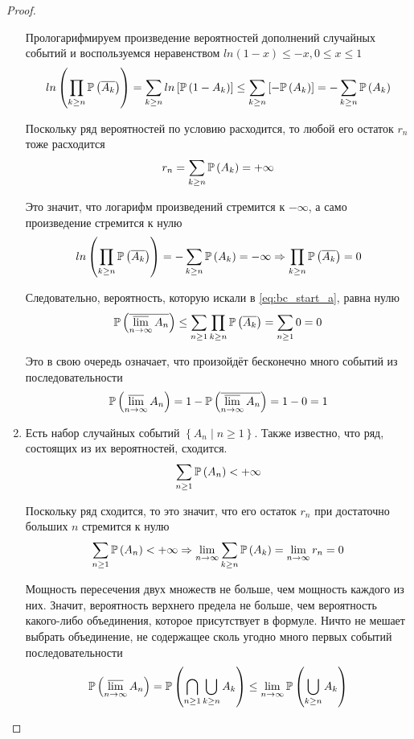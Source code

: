 \begin{proof}
\begin{enumerate}[label=\alph*]
        Прологарифмируем произведение вероятностей дополнений случайных событий
        и воспользуемся неравенством $ln\left(1-x\right)\le -x,0\le x\le 1$
        \cite[стр.~327]{Shiryayev1}
        $$ln\left(\prod_{k\ge n}\mathbb{P}\left( \overline{A_k} \right)\right)
            =\sum_{k\ge n}ln\left[\mathbb{P}\left( 1-A_k \right)\right]
            \le\sum_{k\ge n}\left[-\mathbb{P}\left( A_k \right)\right]
            =-\sum_{k\ge n}\mathbb{P}\left( A_k \right)$$

        Поскольку ряд вероятностей по условию расходится,
        то любой его остаток $r_n$ тоже расходится
        $$r_n=\sum_{k\ge n}\mathbb{P}\left( A_k \right)=+\infty$$

        Это значит, что логарифм произведений стремится к $-\infty$,
        а само произведение стремится к нулю
        \begin{align*}
            ln\left(\prod_{k\ge n}\mathbb{P}\left( \overline{A_k} \right)\right)
                =-\sum_{k\ge n}\mathbb{P}\left( A_k \right)=-\infty
                \Rightarrow\prod_{k\ge n}\mathbb{P}\left( \overline{A_k} \right)=0
        \end{align*}

        Следовательно, вероятность, которую искали в  \eqref{eq:bc_start_a},
        равна нулю
        $$\mathbb{P}\left( \overline{\varlimsup_{n\to\infty}A_n} \right)
            \le \sum_{n\ge 1}\prod_{k\ge n}\mathbb{P}\left( \overline{A_k} \right)
            =\sum_{n\ge 1} 0
            =0$$

        Это в свою очередь означает, что произойдёт бесконечно много событий
        из последовательности
        $$\mathbb{P}\left( \varlimsup_{n\to\infty}A_n \right)
            =1-\mathbb{P}\left( \overline{\varlimsup_{n\to\infty}A_n} \right)
            =1-0=1$$

    \item Есть набор случайных событий $\left\{ A_n\mid n\ge1 \right\}$.
        Также известно, что ряд, состоящих из их вероятностей, сходится.
        $$\sum_{n\ge 1}\mathbb{P}\left( A_n \right) < +\infty$$

        Поскольку ряд сходится, то это значит, что его остаток $r_n$
        при достаточно больших $n$ стремится к нулю \cite[стр.~430]{IlinMA1}
        $$\sum_{n\ge 1}\mathbb{P}\left( A_n \right) < +\infty
        \Rightarrow\lim\limits_{n\to\infty}\sum_{k\ge n}\mathbb{P}\left( A_k \right)
            =\lim\limits_{n\to\infty}r_n=0$$

        Мощность пересечения двух множеств не больше,
        чем мощность каждого из них.
        Значит, вероятность верхнего предела не больше,
        чем вероятность какого-либо объединения, которое присутствует в формуле.
        Ничто не мешает выбрать объединение,
        не содержащее сколь угодно много первых событий последовательности
        \cite[стр.~327]{Shiryayev1}
        $$\mathbb{P}\left( \varlimsup\limits_{n\to\infty} A_n \right)
            =\mathbb{P}\left( \bigcap_{n\ge 1}\bigcup_{k\ge n} A_k \right)
            \le\lim\limits_{n\to\infty}\mathbb{P}\left( \bigcup_{k\ge n} A_k \right)$$


\end{enumerate}
\end{proof}
